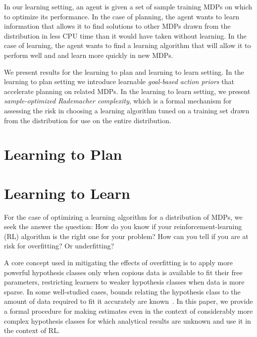 In our learning setting, an agent is given a set of sample training MDPs on which to optimize its performance. In the case of planning, the agent wants to learn information that allows it to find solutions to other MDPs drawn from the distribution in less CPU time than it would have taken without learning. In the case of learning, the agent wants to find a learning algorithm that will allow it to perform well and and learn more quickly in new MDPs.

We present results for the learning to plan and learning to learn setting. In the learning to plan setting we introduce learnable \emph{goal-based action priors} that accelerate planning on related MDPs. In the learning to learn setting, we present \emph{sample-optimized Rademacher complexity},
which is a formal mechanism for assessing the risk in choosing a learning algorithm tuned on a training set drawn from the distribution for use on the entire distribution.

\section{Learning to Plan}



\section{Learning to Learn}
For the case of optimizing a learning algorithm for a distribution of MDPs, we seek the answer the question: How do you know if your reinforcement-learning (RL) algorithm is the right one for your problem? How can you tell if you are at risk for overfitting? Or underfitting?


A core concept used in mitigating the effects of overfitting is to apply more powerful hypothesis classes only when copious data is available to fit their free parameters, restricting learners to weaker hypothesis classes when data is more sparse. In some well-studied cases, bounds relating the hypothesis class to the amount of data required to fit it accurately are known~\cite{blumer1989learnability}. In this paper, we provide a formal procedure for making estimates even in the context of considerably more complex hypothesis classes for which analytical results are unknown and use it in the context of RL.

